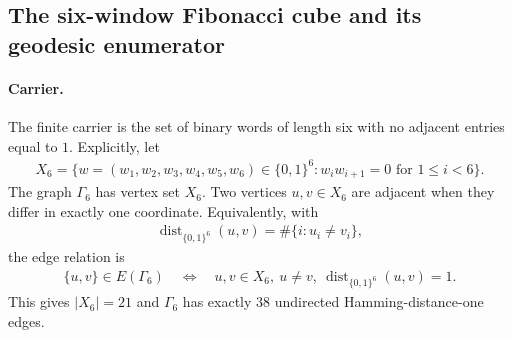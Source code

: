 
\subsection{The six-window Fibonacci cube and its geodesic enumerator}
\label{sec:window6-fibonacci-cube-geodesic-enumerator}

\paragraph{Carrier.}
The finite carrier is the set of binary words of length six with no adjacent entries equal to $1$.  Explicitly, let
$$
\begin{aligned}
X_6=\{w=(w_1,w_2,w_3,w_4,w_5,w_6)\in \{0,1\}^6 : w_iw_{i+1}=0\text{ for }1\leq i<6\}.
\end{aligned}
$$
The graph $\Gamma_6$ has vertex set $X_6$.  Two vertices $u,v\in X_6$ are adjacent when they differ in exactly one coordinate.  Equivalently, with
$$
\begin{aligned}
\operatorname{dist}_{\{0,1\}^6}(u,v)=\#\{i: u_i\neq v_i\},
\end{aligned}
$$
the edge relation is
$$
\begin{aligned}
\{u,v\}\in E(\Gamma_6)\quad\Longleftrightarrow\quad u,v\in X_6,\ u\neq v,\ \operatorname{dist}_{\{0,1\}^6}(u,v)=1.
\end{aligned}
$$
This gives $|X_6|=21$ and $\Gamma_6$ has exactly $38$ undirected Hamming-distance-one edges.

